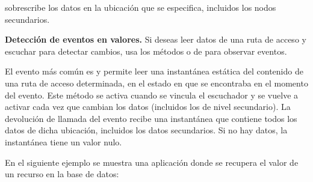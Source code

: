 %
\begin{sphinxVerbatim}[commandchars=\\\{\}]
     
  
     
     
      
\end{sphinxVerbatim}

 sobrescribe los datos en la ubicación que se especifica, incluidos
los nodos secundarios.


\textbf{Detección de eventos en valores.}
\label{\detokenize{firebase_web:detecta-eventos-en-valores}}
Si deseas leer datos de una ruta de acceso y escuchar para detectar cambios,
usa los métodos  o  de 
para observar eventos.

El evento más común es  y permite leer una instantánea estática del
contenido de una ruta de acceso determinada, en el estado en que se encontraba
en el momento del evento. Este método se activa cuando se vincula el escuchador
y se vuelve a activar cada vez que cambian los datos (incluidos los de
nivel secundario). La devolución de llamada del evento recibe una instantánea
que contiene todos los datos de dicha ubicación, incluidos los datos
secundarios. Si no hay datos, la instantánea tiene un valor nulo.

En el siguiente ejemplo se muestra una aplicación donde se recupera el valor
de un recurso en la base de datos:

%
\begin{sphinxVerbatim}[commandchars=\\\{\}]
   
  
\end{sphinxVerbatim}

